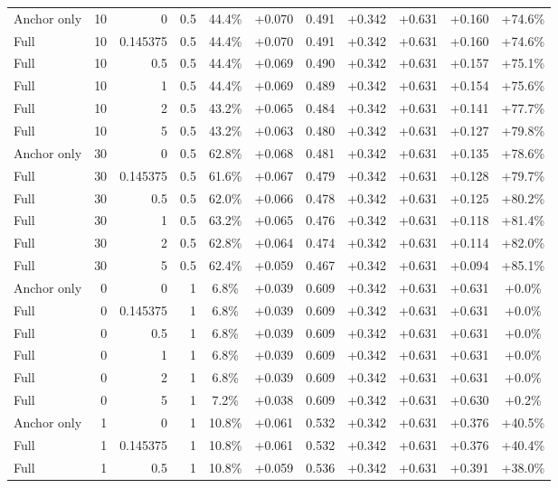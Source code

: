 \begin{table}[htbp]
\begin{tabular}{lrrrccccccc}
Anchor only & 10 & 0 & 0.5 & 44.4\% & +0.070 & 0.491 & +0.342 & +0.631 & +0.160 & +74.6\% \\
Full & 10 & 0.145375 & 0.5 & 44.4\% & +0.070 & 0.491 & +0.342 & +0.631 & +0.160 & +74.6\% \\
Full & 10 & 0.5 & 0.5 & 44.4\% & +0.069 & 0.490 & +0.342 & +0.631 & +0.157 & +75.1\% \\
Full & 10 & 1 & 0.5 & 44.4\% & +0.069 & 0.489 & +0.342 & +0.631 & +0.154 & +75.6\% \\
Full & 10 & 2 & 0.5 & 43.2\% & +0.065 & 0.484 & +0.342 & +0.631 & +0.141 & +77.7\% \\
Full & 10 & 5 & 0.5 & 43.2\% & +0.063 & 0.480 & +0.342 & +0.631 & +0.127 & +79.8\% \\
Anchor only & 30 & 0 & 0.5 & 62.8\% & +0.068 & 0.481 & +0.342 & +0.631 & +0.135 & +78.6\% \\
Full & 30 & 0.145375 & 0.5 & 61.6\% & +0.067 & 0.479 & +0.342 & +0.631 & +0.128 & +79.7\% \\
Full & 30 & 0.5 & 0.5 & 62.0\% & +0.066 & 0.478 & +0.342 & +0.631 & +0.125 & +80.2\% \\
Full & 30 & 1 & 0.5 & 63.2\% & +0.065 & 0.476 & +0.342 & +0.631 & +0.118 & +81.4\% \\
Full & 30 & 2 & 0.5 & 62.8\% & +0.064 & 0.474 & +0.342 & +0.631 & +0.114 & +82.0\% \\
Full & 30 & 5 & 0.5 & 62.4\% & +0.059 & 0.467 & +0.342 & +0.631 & +0.094 & +85.1\% \\
Anchor only & 0 & 0 & 1 & 6.8\% & +0.039 & 0.609 & +0.342 & +0.631 & +0.631 & +0.0\% \\
Full & 0 & 0.145375 & 1 & 6.8\% & +0.039 & 0.609 & +0.342 & +0.631 & +0.631 & +0.0\% \\
Full & 0 & 0.5 & 1 & 6.8\% & +0.039 & 0.609 & +0.342 & +0.631 & +0.631 & +0.0\% \\
Full & 0 & 1 & 1 & 6.8\% & +0.039 & 0.609 & +0.342 & +0.631 & +0.631 & +0.0\% \\
Full & 0 & 2 & 1 & 6.8\% & +0.039 & 0.609 & +0.342 & +0.631 & +0.631 & +0.0\% \\
Full & 0 & 5 & 1 & 7.2\% & +0.038 & 0.609 & +0.342 & +0.631 & +0.630 & +0.2\% \\
Anchor only & 1 & 0 & 1 & 10.8\% & +0.061 & 0.532 & +0.342 & +0.631 & +0.376 & +40.5\% \\
Full & 1 & 0.145375 & 1 & 10.8\% & +0.061 & 0.532 & +0.342 & +0.631 & +0.376 & +40.4\% \\
Full & 1 & 0.5 & 1 & 10.8\% & +0.059 & 0.536 & +0.342 & +0.631 & +0.391 & +38.0\% \\

\end{tabular}
\end{table}
